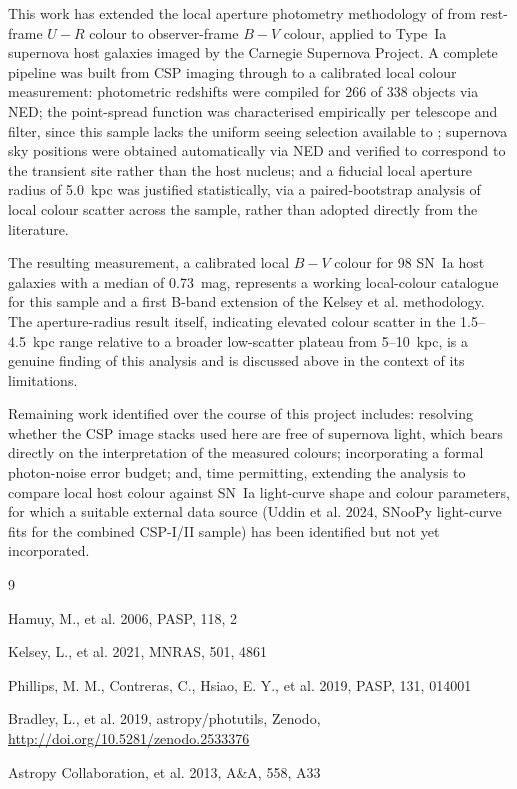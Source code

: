 \documentclass[12pt]{article}
\begin{document}
This work has extended the local aperture photometry methodology of \citet{Kelsey2021} from rest-frame $U-R$ colour to observer-frame $B-V$ colour, applied to Type~Ia supernova host galaxies imaged by the Carnegie Supernova Project. A complete pipeline was built from CSP imaging through to a calibrated local colour measurement: photometric redshifts were compiled for 266 of 338 objects via NED; the point-spread function was characterised empirically per telescope and filter, since this sample lacks the uniform seeing selection available to \citet{Kelsey2021}; supernova sky positions were obtained automatically via NED and verified to correspond to the transient site rather than the host nucleus; and a fiducial local aperture radius of 5.0~kpc was justified statistically, via a paired-bootstrap analysis of local colour scatter across the sample, rather than adopted directly from the literature.

The resulting measurement, a calibrated local $B-V$ colour for 98 SN~Ia host galaxies with a median of 0.73~mag, represents a working local-colour catalogue for this sample and a first B-band extension of the Kelsey et al. methodology. The aperture-radius result itself, indicating elevated colour scatter in the 1.5--4.5~kpc range relative to a broader low-scatter plateau from 5--10~kpc, is a genuine finding of this analysis and is discussed above in the context of its limitations.

Remaining work identified over the course of this project includes: resolving whether the CSP image stacks used here are free of supernova light, which bears directly on the interpretation of the measured colours; incorporating a formal photon-noise error budget; and, time permitting, extending the analysis to compare local host colour against SN~Ia light-curve shape and colour parameters, for which a suitable external data source (Uddin et al. 2024, SNooPy light-curve fits for the combined CSP-I/II sample) has been identified but not yet incorporated.


\begin{thebibliography}{9}

Hamuy, M., et al. 2006, PASP, 118, 2

Kelsey, L., et al. 2021, MNRAS, 501, 4861

Phillips, M. M., Contreras, C., Hsiao, E. Y., et al. 2019, PASP, 131, 014001

Bradley, L., et al. 2019, astropy/photutils, Zenodo, \url{http://doi.org/10.5281/zenodo.2533376}

Astropy Collaboration, et al. 2013, A\&A, 558, A33

\end{thebibliography}
\end{document}
